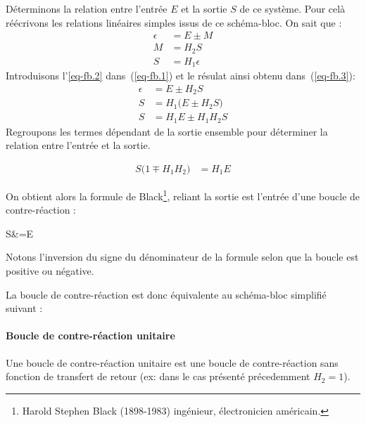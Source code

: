 Déterminons la relation entre l'entrée $E$ et la sortie $S$ de ce système.
Pour celà réécrivons les relations linéaires simples issus de ce schéma-bloc.
On sait que :
\begin{align}
    \epsilon&=E\pm M \label{eq-fb.1}\\
    M&=H_2S       \label{eq-fb.2}\\
    S&=H_1\epsilon \label{eq-fb.3}
\end{align}
Introduisons l'\cref{eq-fb.2} dans~(\ref{eq-fb.1}) et le résulat ainsi obtenu dans~(\ref{eq-fb.3}):
\begin{align*}
    \epsilon&=E\pm H_2S \\
     S&=H_1\big(E\pm H_2S\big) \\
     S&=H_1E\pm H_1H_2S
\end{align*}
Regroupons les termes dépendant de la sortie ensemble pour déterminer 
la relation entre l'entrée et la sortie.

\begin{align*}
    S\big(1\mp H_1H_2\big)&=H_1E 
\end{align*}

On obtient alors la formule de Black\footnote{Harold Stephen Black (1898-1983) ingénieur, 
électronicien américain.}, 
reliant la sortie est l'entrée d'une boucle de contre-réaction :
\begin{bequation}
    S&=E
\end{bequation}

Notons l'inversion du signe du dénominateur de la formule 
selon que la boucle est positive ou négative.

La boucle de contre-réaction est donc équivalente au schéma-bloc simplifié suivant :
\begin{center}
\end{center}


\paragraph{Boucle de contre-réaction unitaire}

Une boucle de contre-réaction unitaire est une boucle de contre-réaction sans 
fonction de transfert de retour (ex: dans le cas présenté précedemment $H_2=1$).

